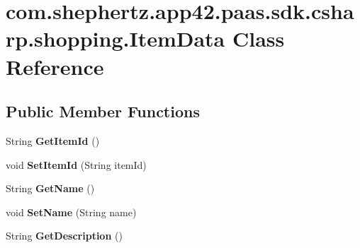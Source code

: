 \hypertarget{classcom_1_1shephertz_1_1app42_1_1paas_1_1sdk_1_1csharp_1_1shopping_1_1_item_data}{\section{com.\+shephertz.\+app42.\+paas.\+sdk.\+csharp.\+shopping.\+Item\+Data Class Reference}
\label{classcom_1_1shephertz_1_1app42_1_1paas_1_1sdk_1_1csharp_1_1shopping_1_1_item_data}
}
\subsection*{Public Member Functions}
\begin{DoxyCompactItemize}
\item 
\hypertarget{classcom_1_1shephertz_1_1app42_1_1paas_1_1sdk_1_1csharp_1_1shopping_1_1_item_data_a8e9eeb9b24276be5b39b7017ad236b3a}{String {\bfseries Get\+Item\+Id} ()}\label{classcom_1_1shephertz_1_1app42_1_1paas_1_1sdk_1_1csharp_1_1shopping_1_1_item_data_a8e9eeb9b24276be5b39b7017ad236b3a}

\item 
\hypertarget{classcom_1_1shephertz_1_1app42_1_1paas_1_1sdk_1_1csharp_1_1shopping_1_1_item_data_a0e5677254c02f2504abf4538532628ca}{void {\bfseries Set\+Item\+Id} (String item\+Id)}\label{classcom_1_1shephertz_1_1app42_1_1paas_1_1sdk_1_1csharp_1_1shopping_1_1_item_data_a0e5677254c02f2504abf4538532628ca}

\item 
\hypertarget{classcom_1_1shephertz_1_1app42_1_1paas_1_1sdk_1_1csharp_1_1shopping_1_1_item_data_a8678ae01abf143258442f2256a0bfb01}{String {\bfseries Get\+Name} ()}\label{classcom_1_1shephertz_1_1app42_1_1paas_1_1sdk_1_1csharp_1_1shopping_1_1_item_data_a8678ae01abf143258442f2256a0bfb01}

\item 
\hypertarget{classcom_1_1shephertz_1_1app42_1_1paas_1_1sdk_1_1csharp_1_1shopping_1_1_item_data_afb41467b44dbfc1bb56067c888a8e6f1}{void {\bfseries Set\+Name} (String name)}\label{classcom_1_1shephertz_1_1app42_1_1paas_1_1sdk_1_1csharp_1_1shopping_1_1_item_data_afb41467b44dbfc1bb56067c888a8e6f1}

\item 
\hypertarget{classcom_1_1shephertz_1_1app42_1_1paas_1_1sdk_1_1csharp_1_1shopping_1_1_item_data_a076c8c60f7f32b54f2794a91a06e37ad}{String {\bfseries Get\+Description} ()}\label{classcom_1_1shephertz_1_1app42_1_1paas_1_1sdk_1_1csharp_1_1shopping_1_1_item_data_a076c8c60f7f32b54f2794a91a06e37ad}


\end{DoxyCompactItemize}
